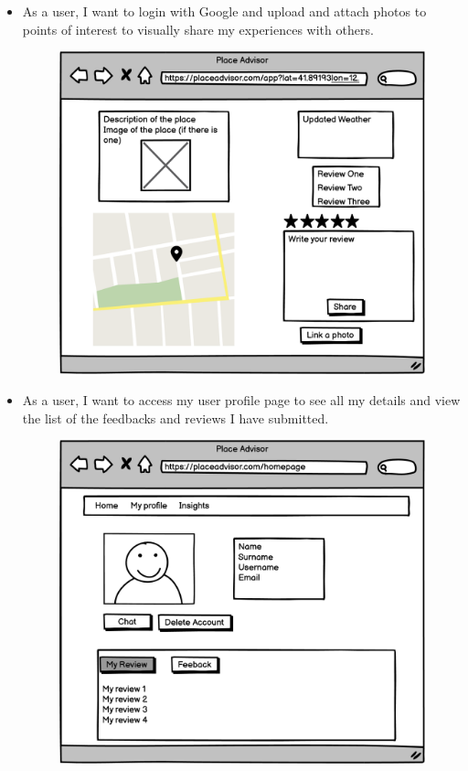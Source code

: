 \documentclass[../main.tex]{subfiles}
\begin{document}
\begin{itemize}
  \item As a user, I want to login with Google and upload and attach photos to points of interest to visually share my experiences with others.
  \begin{figure}[H]
	\centering
	\label{fig:pngegg}
	\includegraphics[width=0.5\linewidth]{../figures/mockup/US7 copy.png}
  \end{figure}
  \item As a user, I want to access my user profile page to see all my details and view the list of the feedbacks and reviews I have submitted.
    \begin{figure}[h]
\begin{multicols}{2}
    \includegraphics[width=\linewidth]{../figures/mockup/US8.png}\par 

\end{multicols}
\end{figure}
\end{itemize}
\end{document}
